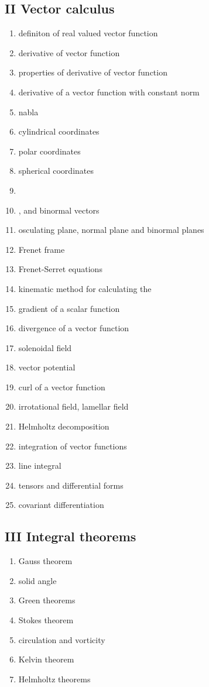 \documentclass[12pt]{article}
\begin{document}
\subsection*{II Vector calculus}
\begin{enumerate}
\item definiton of real valued vector function
\item derivative of vector function
\item properties of derivative of vector function
\item derivative of a vector function with constant norm
\item nabla
\item cylindrical coordinates
\item polar coordinates
\item spherical coordinates
\item {}
\item {},  and binormal vectors
\item osculating plane, normal plane and binormal planes
\item Frenet frame
\item Frenet-Serret equations
\item kinematic method for calculating the 
\item gradient of a scalar function
\item divergence of a vector function
\item solenoidal field
\item vector potential
\item curl of a vector function
\item irrotational field, lamellar field
\item Helmholtz decomposition
\item integration of vector functions
\item line integral
\item tensors and differential forms
\item covariant differentiation
\end{enumerate}

\subsection*{III Integral theorems}
\begin{enumerate}
\item Gauss theorem
\item solid angle
\item Green theorems
\item Stokes theorem
\item circulation and vorticity
\item Kelvin theorem
\item Helmholtz theorems
\end{enumerate}
\end{document}
